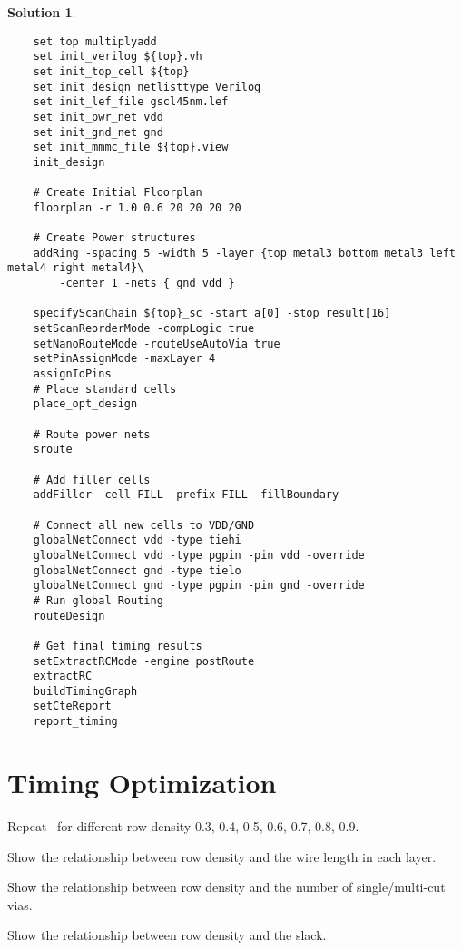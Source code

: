 \documentclass[acmlarge,screen=true,anonymous=false,11pt]{acmart}
\newtheorem*{solution*}{Solution}
\begin{document}
\begin{solution*}
    \lstset{language=tcl,
        basicstyle=\ttfamily\scriptsize
    }
    \begin{lstlisting}
    set top multiplyadd
    set init_verilog ${top}.vh
    set init_top_cell ${top}
    set init_design_netlisttype Verilog
    set init_lef_file gscl45nm.lef
    set init_pwr_net vdd
    set init_gnd_net gnd
    set init_mmmc_file ${top}.view
    init_design
    
    # Create Initial Floorplan
    floorplan -r 1.0 0.6 20 20 20 20
    
    # Create Power structures
    addRing -spacing 5 -width 5 -layer {top metal3 bottom metal3 left metal4 right metal4}\
        -center 1 -nets { gnd vdd }
    
    specifyScanChain ${top}_sc -start a[0] -stop result[16]
    setScanReorderMode -compLogic true
    setNanoRouteMode -routeUseAutoVia true
    setPinAssignMode -maxLayer 4
    assignIoPins
    # Place standard cells
    place_opt_design
    
    # Route power nets
    sroute
    
    # Add filler cells
    addFiller -cell FILL -prefix FILL -fillBoundary
    
    # Connect all new cells to VDD/GND
    globalNetConnect vdd -type tiehi
    globalNetConnect vdd -type pgpin -pin vdd -override
    globalNetConnect gnd -type tielo
    globalNetConnect gnd -type pgpin -pin gnd -override
    # Run global Routing
    routeDesign
    
    # Get final timing results
    setExtractRCMode -engine postRoute
    extractRC
    buildTimingGraph
    setCteReport
    report_timing
    \end{lstlisting}
\end{solution*}
\section{Timing Optimization}
Repeat~ for different row density 0.3, 0.4, 0.5, 0.6, 0.7, 0.8, 0.9.
\begin{example}
    Show the relationship between row density and the wire length in each layer.
\end{example}
\begin{example}
    Show the relationship between row density and the number of single/multi-cut vias.
\end{example}
\begin{example}
    Show the relationship between row density and the slack.
\end{example}
\end{document}
